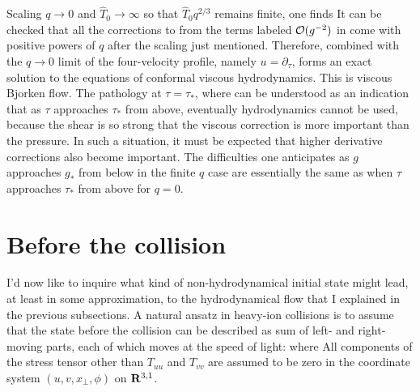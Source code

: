 \documentclass[12pt]{article}
\begin{document}
Scaling $q \to 0$ and $\hat{T}_0 \to \infty$ so that $\hat{T}_0 q^{2/3}$ remains finite, one finds
It can be checked that all the corrections to  from the terms labeled ${\cal O}(g^{-2})$ in  come with positive powers of $q$ after the scaling just mentioned.  Therefore,  combined with the $q \to 0$ limit of the four-velocity profile, namely $u = \partial_\tau$, forms an exact solution to the equations of conformal viscous hydrodynamics.  This is viscous Bjorken flow.  The pathology at $\tau=\tau_*$, where
can be understood as an indication that as $\tau$ approaches $\tau_*$ from above, eventually hydrodynamics cannot be used, because the shear is so strong that the viscous correction is more important than the pressure.  In such a situation, it must be expected that higher derivative corrections also become important.  The difficulties one anticipates as $g$ approaches $g_*$ from below in the finite $q$ case are essentially the same as when $\tau$ approaches $\tau_*$ from above for $q=0$.



\section{Before the collision}
\label{EARLY}

I'd now like to inquire what kind of non-hydrodynamical initial state might lead, at least in some approximation, to the hydrodynamical flow that I explained in the previous subsections.  A natural ansatz in heavy-ion collisions is to assume that the state before the collision can be described as sum of left- and right-moving parts, each of which moves at the speed of light:
where
All components of the stress tensor other than $T_{uu}$ and $T_{vv}$ are assumed to be zero in the coordinate system $(u,v,x_\perp,\phi)$ on ${\bf R}^{3,1}$.  
\end{document}

